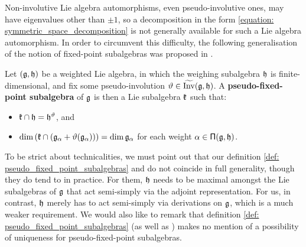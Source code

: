         Non-involutive Lie algebra automorphisms, even pseudo-involutive ones, may have eigenvalues other than $\pm 1$, so a decomposition in the form \eqref{equation: symmetric_space_decomposition} is not generally available for such a Lie algebra automorphism. In order to circumvent this difficulty, the following generalisation of the notion of fixed-point subalgebras was proposed in \cite[Definition 1.2]{regelskis_vlaar_kac_moody_pseudo_symmetric_pairs}. 
        \begin{definition} \label{def: pseudo_fixed_point_subalgebras}
            Let $(\mathfrak{g}, \mathfrak{h})$ be a weighted Lie algebra, in which the weighing subalgebra $\mathfrak{h}$ is finite-dimensional, and fix some pseudo-involution $\vartheta \in \widetilde{\operatorname{Inv}}(\mathfrak{g}, \mathfrak{h})$. A \textbf{pseudo-fixed-point subalgebra} of $\mathfrak{g}$ is then a Lie subalgebra $\mathfrak{k}$ such that:
            \begin{itemize}
                \item $\mathfrak{k} \cap \mathfrak{h} = \mathfrak{h}^{\vartheta}$, and
                \item $\dim\left( \mathfrak{k} \cap ( \mathfrak{g}_{\alpha} + \vartheta(\mathfrak{g}_{\alpha}) ) \right) = \dim \mathfrak{g}_{\alpha}$ for each weight $\alpha \in \mathsf{\Pi}(\mathfrak{g}, \mathfrak{h})$.
            \end{itemize}
        \end{definition}
        \begin{remark}
            To be strict about technicalities, we must point out that our definition \eqref{def: pseudo_fixed_point_subalgebras} and \cite[Definition 1.2]{regelskis_vlaar_kac_moody_pseudo_symmetric_pairs} do not coincide in full generality, though they do tend to in practice. For them, $\mathfrak{h}$ needs to be maximal amongst the Lie subalgebras of $\mathfrak{g}$ that act semi-simply via the adjoint representation. For us, in contrast, $\mathfrak{h}$ merely has to act semi-simply via derivations on $\mathfrak{g}$, which is a much weaker requirement. We would also like to remark that definition \ref{def: pseudo_fixed_point_subalgebras} (as well as \cite[Definition 1.2]{regelskis_vlaar_kac_moody_pseudo_symmetric_pairs}) makes no mention of a possibility of uniqueness for pseudo-fixed-point subalgebras.
        \end{remark}

